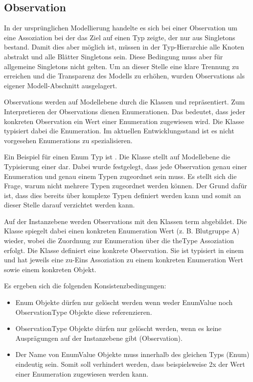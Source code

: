 \subsection{Observation}\label{Observations}
In der ursprünglichen Modellierung handelte es sich bei einer Observation um eine Assoziation bei der das Ziel auf einen 
Typ zeigte, der nur aus Singletons bestand. Damit dies aber möglich ist, müssen in der Typ-Hierarchie alle Knoten 
abstrakt und alle Blätter Singletons sein. Diese Bedingung muss aber für allgemeine Singletons nicht gelten. Um an dieser 
Stelle eine klare Trennung zu erreichen und die Transparenz des Modells zu erhöhen, wurden Observations als eigener Modell-Abschnitt ausgelagert.


Observations werden auf Modellebene durch die Klassen  und  repräsentiert. 
Zum Interpretieren der Observations dienen Enumerationen. Das bedeutet, dass jeder konkreten Observation
ein Wert einer Enumeration zugewiesen wird. Die Klasse  typisiert dabei die Enumeration. 
Im aktuellen Entwicklungsstand ist es nicht vorgesehen Enumerations zu spezialisieren.

Ein Beispiel für einen Enum Typ ist . Die Klasse  stellt auf Modellebene die 
Typisierung einer  dar. Dabei wurde festgelegt, dass jede Observation genau einer Enumeration 
und genau einem Typen zugeordnet sein muss. Es stellt sich die Frage, warum nicht mehrere Typen zugeordnet werden können. 
Der Grund dafür ist, dass dies bereits über komplexe Typen definiert werden kann und somit an dieser Stelle darauf verzichtet werden kann.

Auf der Instanzebene werden Observations mit den Klassen  term  abgebildet. 
Die Klasse  spiegelt dabei einen konkreten Enumeration Wert (z. B. Blutgruppe A) wieder, 
wobei die Zuordnung zur Enumeration über die theType Assoziation erfolgt. Die Klasse  definiert eine konkrete Observation. 
Sie ist typisiert in einem  und hat jeweils eine zu-Eins Assoziation zu einem konkreten Enumeration Wert sowie einem konkreten Objekt.

Es ergeben sich die folgenden Konsistenzbedingungen:
\begin{itemize}
  \item Enum Objekte dürfen nur gelöscht werden wenn weder EnumValue noch ObservationType Objekte diese referenzieren.
  \item ObservationType Objekte dürfen nur gelöscht werden, wenn es keine Ausprägungen auf der Instanzebene gibt (Observation).
  \item Der Name von EnumValue Objekte muss innerhalb des gleichen Typs (Enum) eindeutig sein. Somit soll verhindert werden, dass beispielsweise 2x der Wert  einer Enumeration  zugewiesen werden kann.
\end{itemize}

